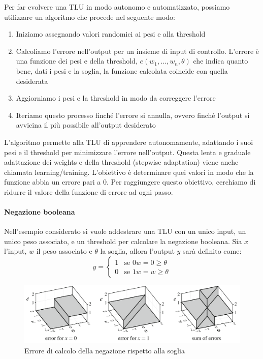 Per far evolvere una TLU in modo autonomo e automatizzato, possiamo utilizzare un algoritmo che procede nel seguente modo:
\begin{enumerate}
    \item Iniziamo assegnando valori randomici ai pesi e alla threshold
    \item Calcoliamo l'errore nell'output per un insieme di input di controllo. L'errore è una funzione dei pesi e della threshold, $e(w_1, \dots , w_n, \theta)$ che indica quanto bene, dati i pesi e la soglia, la funzione calcolata coincide con quella desiderata
    \item Aggiorniamo i pesi e la threshold in modo da correggere l'errore
    \item Iteriamo questo processo finché l'errore si annulla, ovvero finché l'output si avvicina il più possibile all'output desiderato
\end{enumerate}
L'algoritmo permette alla TLU di apprendere autonomamente, adattando i suoi pesi e il threshold per minimizzare l'errore nell'output. Questa lenta e graduale adattazione dei weights e della threshold (stepwise adaptation) viene anche chiamata learning/training. L'obiettivo è determinare quei valori in modo che la funzione abbia un errore pari a $0$. Per raggiungere questo obiettivo, cerchiamo di ridurre il valore della funzione di errore ad ogni passo.

\paragraph{Negazione booleana}
Nell'esempio considerato si vuole addestrare una TLU con un unico input, un unico peso associato, e un threshold per calcolare la negazione booleana. Sia $x$ l’input, $w$ il peso associato e $\theta$ la soglia, allora l’output $y$ sarà definito come:
$$
y = \begin{cases}
    1 & \text{se } 0w = 0 \geq \theta \\
    0 & \text{se } 1w = w \geq \theta
   \end{cases}
$$

\begin{figure}[h]
    \centering
    \includegraphics[scale=0.35]{images/error.png}
    \caption{Errore di calcolo della negazione rispetto alla soglia}
\end{figure}

